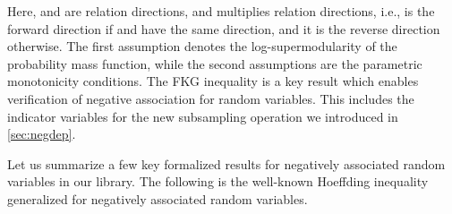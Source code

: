 Here, \isa{\isasymsigma} and \isa{\isasymtau} are relation directions, and \isa{\isasymsigma\ \isacharasterisk\ \isasymtau} multiplies relation directions, i.e., \isa{\isasymsigma\ \isacharasterisk\ \isasymtau} is the forward direction if \isa{\isasymsigma} and \isa{\isasymtau} have the same direction, and it is the reverse direction otherwise.
The first assumption denotes the log-supermodularity of the probability mass function, while the second assumptions are the parametric monotonicity conditions.
The FKG inequality is a key result which enables verification of negative association for random variables.
This includes the indicator variables for the new subsampling operation we introduced in \cref{sec:negdep}.

Let us summarize a few key formalized results for negatively associated random variables in our library.
The following is the well-known Hoeffding inequality~\cite{hoeffding1963} generalized for negatively associated random variables.
